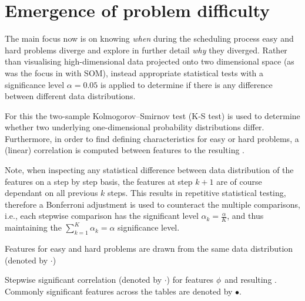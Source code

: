 \section{Emergence of problem difficulty}\label{sec:diff:stepwise}


The main focus now is on knowing \emph{when} during the scheduling process easy 
and hard problems diverge and explore in further detail \emph{why} they 
diverged. 
Rather than visualising high-dimensional data projected onto two dimensional 
space (as was the focus in \cite{SmithMilesLion5} with SOM), 
instead appropriate statistical tests with a significance level $\alpha=0.05$ 
is applied to determine if there is any difference between different data 
distributions. 

For this the two-sample Kolmogorov–Smirnov test (K-S test) is used to determine 
whether two underlying one-dimensional probability distributions differ. 
Furthermore, in order to find defining characteristics for easy or hard 
problems, a (linear) correlation is computed between features to the resulting 
\namerho. 

Note, when inspecting any statistical difference between data distribution of 
the features on a step by step basis, the features at step $k+1$ are of course 
dependant on all previous $k$ steps. This results in repetitive statistical 
testing, therefore a Bonferroni adjustment is used to counteract the multiple 
comparisons, i.e., each stepwise comparison has the significant level 
$\alpha_k=\frac{\alpha}{K}$, and thus maintaining the 
$\sum_{k=1}^K\alpha_k=\alpha$ significance level.

\begin{table}
    \caption[Features for easy and hard problems are drawn from the same data 
    distribution]{Features for easy and hard problems are drawn from the same 
    data distribution (denoted by $\cdot$)}\label{tbl:jrnd:feat:same}
\end{table}

\begin{table}
    \caption[Stepwise significant correlation between features $\vphi$ to 
        \namerho]{Stepwise significant correlation (denoted by $\cdot$) for 
        features $\vphi$ and resulting \namerho. Commonly significant features
        across the tables are denoted by $\bullet$.}\label{tbl:jrnd:feat}
\end{table}

